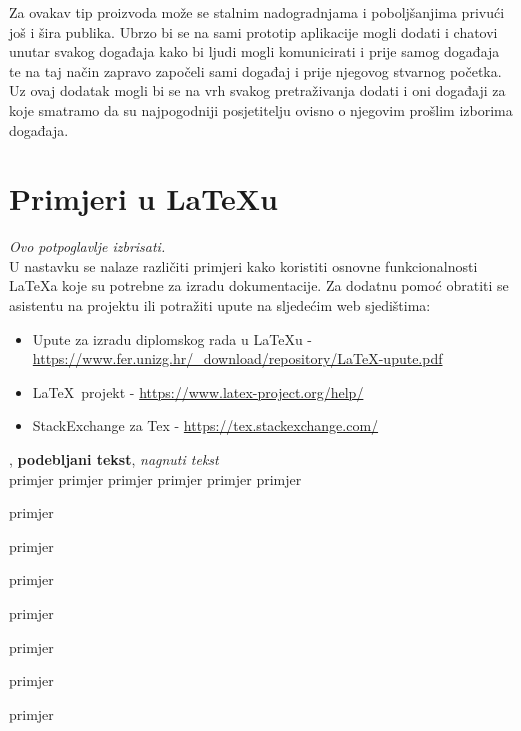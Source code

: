 		Za ovakav tip proizvoda može se stalnim nadogradnjama i poboljšanjima privući još i šira publika. Ubrzo bi se na sami prototip aplikacije mogli dodati i chatovi unutar svakog događaja kako bi ljudi mogli komunicirati i prije samog događaja te na taj način zapravo započeli sami događaj i prije njegovog stvarnog početka. Uz ovaj dodatak mogli bi se na vrh svakog pretraživanja dodati i oni događaji za koje smatramo da su najpogodniji posjetitelju ovisno o njegovim prošlim izborima događaja. 
		
		
		\eject
		
		\section{Primjeri u \LaTeX u}
		
		\textit{Ovo potpoglavlje izbrisati.}\\

		U nastavku se nalaze različiti primjeri kako koristiti osnovne funkcionalnosti \LaTeX a koje su potrebne za izradu dokumentacije. Za dodatnu pomoć obratiti se asistentu na projektu ili potražiti upute na sljedećim web sjedištima:
		\begin{itemize}
			\item Upute za izradu diplomskog rada u \LaTeX u - \url{https://www.fer.unizg.hr/_download/repository/LaTeX-upute.pdf}
			\item \LaTeX\ projekt - \url{https://www.latex-project.org/help/}
			\item StackExchange za Tex - \url{https://tex.stackexchange.com/}\\
		
		\end{itemize} 	


		
		\noindent {}, \textbf{podebljani tekst}, 	\textit{nagnuti tekst}\\
		\noindent \normalsize primjer \large primjer \Large primjer \LARGE {primjer} \huge {primjer} \Huge primjer \normalsize
				
		\begin{packed_item}
			
			\item  primjer
			\item  primjer
			\item  primjer
			\item[] \begin{packed_enum}
				\item primjer
				\item[] \begin{packed_enum}
					\item[1.a] primjer
					\item[b] primjer
				\end{packed_enum}
				\item primjer
			\end{packed_enum}
			
		\end{packed_item}
		
